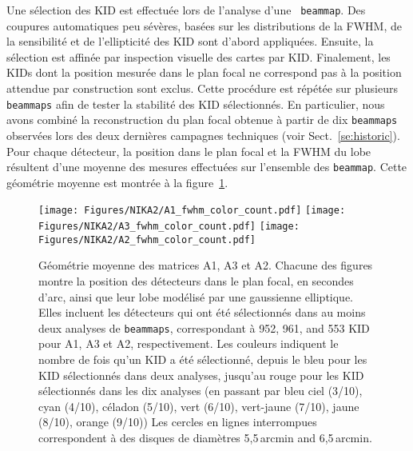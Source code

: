 Une sélection des KID est effectuée lors de l'analyse d'une {\tt
  beammap}. Des coupures automatiques peu sévères, basées sur les
distributions de la FWHM, de la sensibilité et de l'ellipticité des
KID sont d'abord appliquées. Ensuite, la sélection est affinée par
inspection visuelle des cartes par KID. Finalement, les KIDs dont la
position mesurée dans le plan focal ne correspond pas à la position
attendue par construction sont exclus. Cette procédure est répétée
sur plusieurs {\tt beammaps} afin de tester la stabilité des KID
sélectionnés. En particulier, nous avons combiné la reconstruction du
plan focal obtenue à partir de dix {\tt beammaps} observées lors des
deux dernières campagnes techniques (voir
Sect.~\ref{se:historic}). Pour chaque détecteur, la position dans le
plan focal et la FWHM du lobe résultent d'une moyenne des mesures
effectuées sur l'ensemble des {\tt beammap}. Cette géométrie moyenne
est montrée à la figure~\ref{fig:avg_fov_color}.

\begin{figure}[!thbp]
\begin{center}
\texttt{[image: Figures/NIKA2/A1\_fwhm\_color\_count.pdf]}
\texttt{[image: Figures/NIKA2/A3\_fwhm\_color\_count.pdf]}
\texttt{[image: Figures/NIKA2/A2\_fwhm\_color\_count.pdf]}
\caption[La sélection des KID]{Géométrie moyenne des matrices A1, A3
  et A2. Chacune des figures montre la position des détecteurs
  dans le plan focal, en secondes d'arc, ainsi que leur lobe modélisé par une
  gaussienne elliptique. Elles incluent les détecteurs qui ont été sélectionnés
  dans au moins deux analyses de {\tt beammaps}, correspondant à 952,
  961, and 553 KID pour A1, A3 et A2, respectivement.
  Les couleurs indiquent le nombre de fois qu'un KID a été
  sélectionné, depuis le bleu pour les KID sélectionnés dans deux
  analyses, jusqu'au rouge pour les KID sélectionnés dans les dix
  analyses (en passant par bleu ciel (3/10),
  cyan (4/10), céladon (5/10), vert (6/10), vert-jaune (7/10), jaune (8/10), orange (9/10)) 
  Les cercles en lignes interrompues correspondent à des disques de
  diamètres 5,5\,arcmin and 6,5\,arcmin.}
\label{fig:avg_fov_color}
\end{center}
\end{figure}

